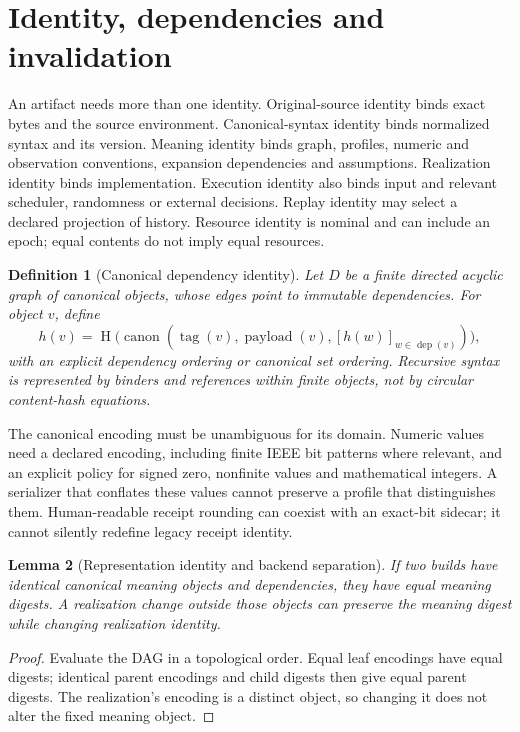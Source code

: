 \documentclass[11pt]{article}
\newtheorem{definition}{Definition}[section]
\newtheorem{lemma}[definition]{Lemma}
\theoremstyle{remark}
\newcommand{\dep}{\operatorname{dep}}
\newcommand{\canon}{\operatorname{canon}}
\newcommand{\hash}{\operatorname{H}}
\begin{document}
\section{Identity, dependencies and invalidation}
\label{sec:identity}

An artifact needs more than one identity. Original-source identity binds
exact bytes and the source environment. Canonical-syntax identity binds
normalized syntax and its version. Meaning identity binds graph, profiles,
numeric and observation conventions, expansion dependencies and assumptions.
Realization identity binds implementation. Execution identity also binds
input and relevant scheduler, randomness or external decisions. Replay
identity may select a declared projection of history. Resource identity is
nominal and can include an epoch; equal contents do not imply equal resources.

\begin{definition}[Canonical dependency identity]
Let $D$ be a finite directed acyclic graph of canonical objects, whose edges
point to immutable dependencies. For object $v$, define
\[
 h(v)=\hash\bigl(\canon(\operatorname{tag}(v),
       \operatorname{payload}(v),[h(w)]_{w\in\dep(v)})\bigr),
\]
with an explicit dependency ordering or canonical set ordering. Recursive
syntax is represented by binders and references within finite objects,
not by circular content-hash equations.
\end{definition}

The canonical encoding must be unambiguous for its domain. Numeric values
need a declared encoding, including finite IEEE bit patterns where relevant,
and an explicit policy for signed zero, nonfinite values and mathematical
integers. A serializer that conflates these values cannot preserve a profile
that distinguishes them. Human-readable receipt rounding can coexist with
an exact-bit sidecar; it cannot silently redefine legacy receipt identity.

\begin{lemma}[Representation identity and backend separation]
If two builds have identical canonical meaning objects and dependencies,
they have equal meaning digests. A realization change outside those objects
can preserve the meaning digest while changing realization identity.
\end{lemma}
\begin{proof}
Evaluate the DAG in a topological order. Equal leaf encodings have equal
digests; identical parent encodings and child digests then give equal parent
digests. The realization's encoding is a distinct object, so changing it
does not alter the fixed meaning object.
\end{proof}
\end{document}
